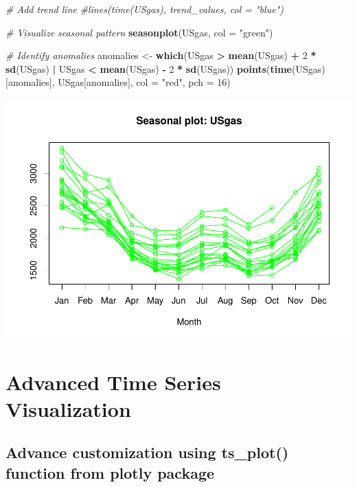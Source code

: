 \documentclass[
]{book}
\newenvironment{Shaded}{\begin{snugshade}}{\end{snugshade}}
\newcommand{\AttributeTok}[1]{\textcolor[rgb]{0.13,0.29,0.53}{#1}}
\newcommand{\CommentTok}[1]{\textcolor[rgb]{0.56,0.35,0.01}{\textit{#1}}}
\newcommand{\DecValTok}[1]{\textcolor[rgb]{0.00,0.00,0.81}{#1}}
\newcommand{\FunctionTok}[1]{\textcolor[rgb]{0.13,0.29,0.53}{\textbf{#1}}}
\newcommand{\NormalTok}[1]{#1}
\newcommand{\OtherTok}[1]{\textcolor[rgb]{0.56,0.35,0.01}{#1}}
\newcommand{\SpecialCharTok}[1]{\textcolor[rgb]{0.81,0.36,0.00}{\textbf{#1}}}
\newcommand{\StringTok}[1]{\textcolor[rgb]{0.31,0.60,0.02}{#1}}
\begin{document}
\begin{Shaded}
\begin{Highlighting}[]
\CommentTok{\# Add trend line}
\CommentTok{\#lines(time(USgas), trend\_values, col = "blue")}

\CommentTok{\# Visualize seasonal pattern}
\FunctionTok{seasonplot}\NormalTok{(USgas, }\AttributeTok{col =} \StringTok{"green"}\NormalTok{)}

\CommentTok{\# Identify anomalies}
\NormalTok{anomalies }\OtherTok{\textless{}{-}} \FunctionTok{which}\NormalTok{(USgas }\SpecialCharTok{\textgreater{}} \FunctionTok{mean}\NormalTok{(USgas) }\SpecialCharTok{+} \DecValTok{2} \SpecialCharTok{*} \FunctionTok{sd}\NormalTok{(USgas) }\SpecialCharTok{|}\NormalTok{ USgas }\SpecialCharTok{\textless{}} \FunctionTok{mean}\NormalTok{(USgas) }\SpecialCharTok{{-}} \DecValTok{2} \SpecialCharTok{*} \FunctionTok{sd}\NormalTok{(USgas))}
\FunctionTok{points}\NormalTok{(}\FunctionTok{time}\NormalTok{(USgas)[anomalies], USgas[anomalies], }\AttributeTok{col =} \StringTok{"red"}\NormalTok{, }\AttributeTok{pch =} \DecValTok{16}\NormalTok{)}
\end{Highlighting}
\end{Shaded}

\includegraphics{_main_files/figure-latex/unnamed-chunk-62-2.pdf}

\section{Advanced Time Series Visualization}\label{advanced-time-series-visualization}

\subsection{\texorpdfstring{Advance customization using ts\_plot() function from \textbf{plotly} package}{Advance customization using ts\_plot() function from plotly package}}\label{advance-customization-using-ts_plot-function-from-plotly-package}
\end{document}
